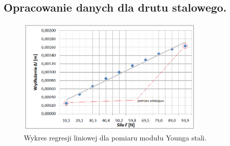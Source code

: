 \documentclass [a4paper,11pt]{article}
\begin{document}
	\subsection{Opracowanie danych dla drutu stalowego.}
	\begin{figure}[!h]
		\centering
		\includegraphics[width=0.8\textwidth]{wykstal}
		\caption{Wykres regresji liniowej dla pomiaru modułu Younga stali.}
		\label{fig:wykstal}
	\end{figure}
	
\end{document}
